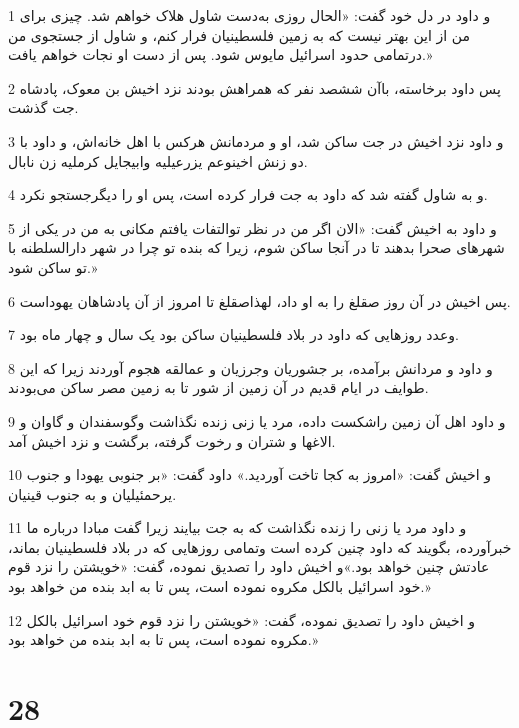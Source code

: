 \par 1 و داود در دل خود گفت: «الحال روزی به‌دست شاول هلاک خواهم شد. چیزی برای من از این بهتر نیست که به زمین فلسطینیان فرار کنم، و شاول از جستجوی من درتمامی حدود اسرائیل مایوس شود. پس از دست او نجات خواهم یافت.»
\par 2 پس داود برخاسته، باآن ششصد نفر که همراهش بودند نزد اخیش بن معوک، پادشاه جت گذشت.
\par 3 و داود نزد اخیش در جت ساکن شد، او و مردمانش هرکس با اهل خانه‌اش، و داود با دو زنش اخینوعم یزرعیلیه وابیجایل کرملیه زن نابال.
\par 4 و به شاول گفته شد که داود به جت فرار کرده است، پس او را دیگرجستجو نکرد.
\par 5 و داود به اخیش گفت: «الان اگر من در نظر توالتفات یافتم مکانی به من در یکی از شهرهای صحرا بدهند تا در آنجا ساکن شوم، زیرا که بنده تو چرا در شهر دارالسلطنه با تو ساکن شود.»
\par 6 پس اخیش در آن روز صقلغ را به او داد، لهذاصقلغ تا امروز از آن پادشاهان یهوداست.
\par 7 وعدد روزهایی که داود در بلاد فلسطینیان ساکن بود یک سال و چهار ماه بود.
\par 8 و داود و مردانش برآمده، بر جشوریان وجرزیان و عمالقه هجوم آوردند زیرا که این طوایف در ایام قدیم در آن زمین از شور تا به زمین مصر ساکن می‌بودند.
\par 9 و داود اهل آن زمین راشکست داده، مرد یا زنی زنده نگذاشت وگوسفندان و گاوان و الاغها و شتران و رخوت گرفته، برگشت و نزد اخیش آمد.
\par 10 و اخیش گفت: «امروز به کجا تاخت آوردید.» داود گفت: «بر جنوبی یهودا و جنوب یرحمئیلیان و به جنوب قینیان.
\par 11 و داود مرد یا زنی را زنده نگذاشت که به جت بیایند زیرا گفت مبادا درباره ما خبر‌آورده، بگویند که داود چنین کرده است وتمامی روزهایی که در بلاد فلسطینیان بماند، عادتش چنین خواهد بود.»و اخیش داود را تصدیق نموده، گفت: «خویشتن را نزد قوم خود اسرائیل بالکل مکروه نموده است، پس تا به ابد بنده من خواهد بود.»
\par 12 و اخیش داود را تصدیق نموده، گفت: «خویشتن را نزد قوم خود اسرائیل بالکل مکروه نموده است، پس تا به ابد بنده من خواهد بود.»
 
\chapter{28}


